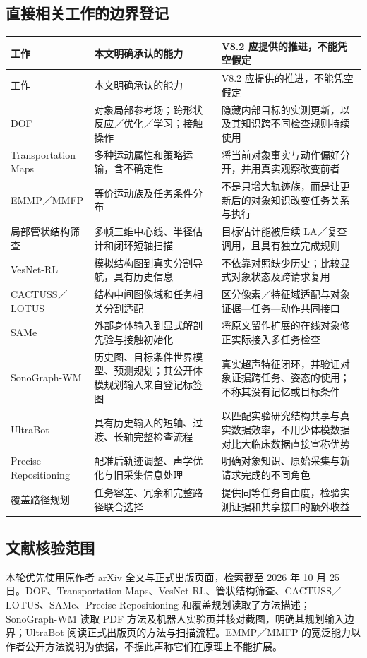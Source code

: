\documentclass[UTF8,11pt,a4paper,fontset=fandol]{ctexart}
\numberwithin{equation}{section}
\theoremstyle{definition}
\begin{document}
\subsection{直接相关工作的边界登记}
\begin{longtable}{P{30mm}P{59mm}P{59mm}}
\toprule
工作 & 本文明确承认的能力 & V8.2 应提供的推进，不能凭空假定\\\midrule\endfirsthead
\toprule 工作 & 本文明确承认的能力 & V8.2 应提供的推进，不能凭空假定\\\midrule\endhead
DOF\cite{dof} & 对象局部参考场；跨形状反应／优化／学习；接触操作 & 隐藏内部目标的实测更新，以及其知识跨不同检查规则持续使用\\
Transportation Maps\cite{transport} & 多种运动属性和策略运输，含不确定性 & 将当前对象事实与动作偏好分开，并用真实观察改变前者\\
EMMP／MMFP\cite{emmp,mmfp} & 等价运动族及任务条件分布 & 不是只增大轨迹族，而是让更新后的对象知识改变任务关系与执行\\
局部管状结构筛查\cite{tubular} & 多帧三维中心线、半径估计和闭环短轴扫描 & 目标估计能被后续 LA／复查调用，且具有独立完成规则\\
VesNet-RL\cite{vesnet} & 模拟结构图到真实分割导航，具有历史信息 & 不依靠对照缺少历史；比较显式对象状态及跨请求复用\\
CACTUSS／LOTUS\cite{cactuss,lotus} & 结构中间图像域和任务相关分割适配 & 区分像素／特征域适配与对象证据—任务—动作共同接口\\
SAMe\cite{same} & 外部身体输入到显式解剖先验与接触初始化 & 将原文留作扩展的在线对象修正实际接入多任务检查\\
SonoGraph-WM\cite{sonograph} & 历史图、目标条件世界模型、预测规划；其公开体模规划输入来自登记标签图 & 真实超声特征闭环，并验证对象证据跨任务、姿态的使用；不称其没有记忆或目标条件\\
UltraBot\cite{ultrabot} & 具有历史输入的短轴、过渡、长轴完整检查流程 & 以匹配实验研究结构共享与真实数据效率，不用少体模数据对比大临床数据直接宣称优势\\
Precise Repositioning\cite{reposition} & 配准后轨迹调整、声学优化与旧采集信息处理 & 明确对象知识、原始采集与新请求完成的不同角色\\
覆盖路径规划\cite{coverageplan} & 任务容差、冗余和完整路径联合选择 & 提供同等任务自由度，检验实测证据和共享接口的额外收益\\\bottomrule
\end{longtable}

\subsection{文献核验范围}
本轮优先使用原作者 arXiv 全文与正式出版页面，检索截至 2026 年 10 月 25 日。DOF、Transportation Maps、VesNet-RL、管状结构筛查、CACTUSS／LOTUS、SAMe、Precise Repositioning 和覆盖规划读取了方法描述；SonoGraph-WM 读取 PDF 方法及机器人实验页并核对截图，明确其规划输入边界；UltraBot 阅读正式出版页的方法与扫描流程。EMMP／MMFP 的宽泛能力以作者公开方法说明为依据，不据此声称它们在原理上不能扩展。
\end{document}
